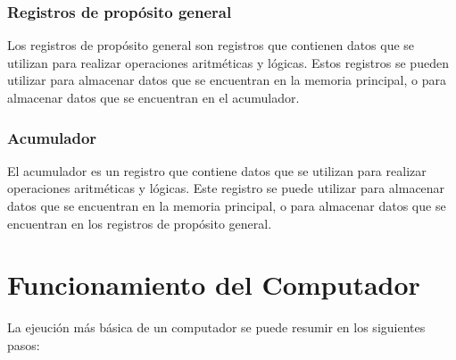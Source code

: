 \documentclass{article}
\begin{document}
\subsubsection*{Registros de propósito general}
Los registros de prop\'{o}sito general son registros que contienen datos que se
utilizan para realizar operaciones aritm\'{e}ticas y l\'{o}gicas. Estos registros
se pueden utilizar para almacenar datos que se encuentran en la memoria principal,
o para almacenar datos que se encuentran en el acumulador.

\subsubsection*{Acumulador}
El acumulador es un registro que contiene datos que se utilizan para realizar
operaciones aritm\'{e}ticas y l\'{o}gicas. Este registro se puede utilizar para
almacenar datos que se encuentran en la memoria principal, o para almacenar datos
que se encuentran en los registros de prop\'{o}sito general.
\newpage

\section*{Funcionamiento del Computador}
La ejeuci\'{o}n m\'{a}s b\'{a}sica de un computador se puede resumir en los siguientes
pasos:
\end{document}
